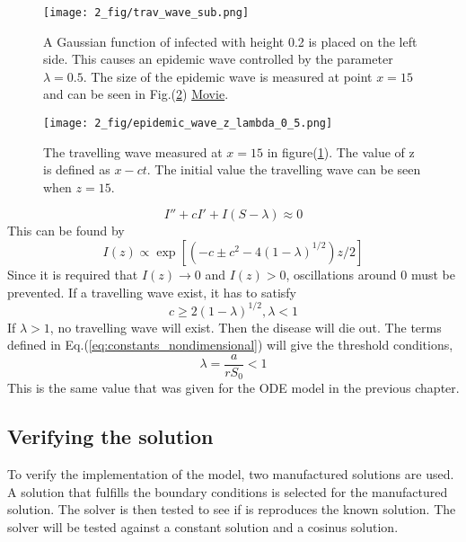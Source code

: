 \documentclass[%
twoside,                 %
final,                   %
chapterprefix=true,      %
open=right               %
10pt]{book}
\begin{document}
\begin{figure}[ht]
  \centerline{\texttt{[image: 2\_fig/trav\_wave\_sub.png]}}
  \caption{
  \label{fig:1D_sub} A Gaussian function of infected with height 0.2 is placed on the left side. This causes an epidemic wave controlled by the parameter $\lambda=0.5$. The size of the epidemic wave is measured at point $x=15$ and can be seen in Fig.(\ref{fig:1D_tw}) \href{{https://torbjornseland.github.io/master}}{Movie}.
  }
\end{figure}



\begin{figure}[ht]
  \centerline{\texttt{[image: 2\_fig/epidemic\_wave\_z\_lambda\_0\_5.png]}}
  \caption{
  \label{fig:1D_tw} The travelling wave measured at $x=15$ in figure(\ref{fig:1D_sub}). The value of z is defined as $x-ct$. The initial value the travelling wave can be seen when $z=15$.
  }
\end{figure}


\begin{equation} \label{eq:z_inf}
	I'' + cI' + I(S-\lambda) \approx 0 
\end{equation}
This can be found by
\begin{equation}
I(z) \propto \exp\left[(-c \pm {c^2 -4(1-\lambda)}^{1/2})z/2\right]
\end{equation}
Since it is required that $I(z)\rightarrow 0$ and $I(z) > 0$, oscillations around 0 must be prevented. If a travelling wave exist, it has to satisfy
\begin{equation}
	c \geq 2(1-\lambda)^{1/2}, \lambda < 1
\end{equation}
If $\lambda > 1$, no travelling wave will exist. Then the disease will die out. The terms defined in Eq.(\ref{eq:constants_nondimensional}) will give the threshold conditions,
\begin{equation}
	\lambda = \frac{a}{rS_0} < 1
\end{equation}
This is the same value that was given for the ODE model in the previous chapter.
\subsection{Verifying the solution}
To verify the implementation of the model, two manufactured solutions are used. A solution that fulfills the boundary conditions is selected for the manufactured solution. The solver is then tested to see if is reproduces the known solution. The solver will be tested against a constant solution and a cosinus solution. 
\end{document}
